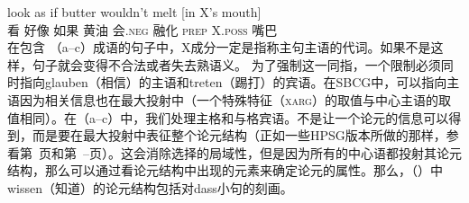 \gll look as if butter wouldn't melt [in X's mouth]\\
看 好像 如果 黄油 会.\textsc{neg} 融化 \spacebr{}\textsc{prep} X.\textsc{poss} 嘴巴\\
\zl
在包含 （a--c）成语的句子中，X成分一定是指称主句主语的代词。如果不是这样，句子就会变得不合法或者失去熟语义。
\eal
{}
\zl
为了强制这一同指，一个限制必须同时指向glauben（相信）的主语和treten（踢打）的宾语。在SBCG中，可以指向主语因为相关信息也在最大投射中（一个特殊特征（\textsc{xarg}）的取值与中心主语的取值相同）。在（a--c）中，我们处理主格和与格宾语。不是让一个论元的信息可以得到，而是要在最大投射中表征整个论元结构（正如一些HPSG版本所做的那样，参看第~\pageref{Seite-Bender-Wambaya}页和第~\pageref{page-Bender-Wambaya-two}--\pageref{page-non-cancellation-end}页）。这会消除选择的局域性，但是因为所有的中心语都投射其论元结构，那么可以通过看论元结构中出现的元素来确定论元的属性。那么，（）中wissen（知道）的论元结构包括对dass小句的刻画。
